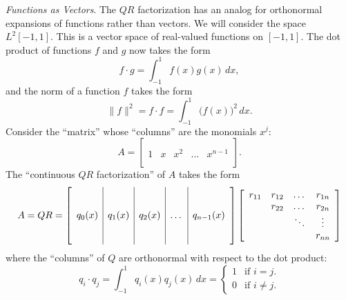 \documentclass[12pt]{exam}
\begin{document}
\begin{questions}

\question \emph{Functions as Vectors}. The $QR$ factorization has an analog for orthonormal expansions of functions rather than vectors. We will consider the space $L^2[-1,1]$. This is a vector space of real-valued functions on $[-1,1]$. The dot product of functions $f$ and $g$ now takes the form
\[f \cdot g = \int_{-1}^1 f(x) g(x)\,dx ,\]
and the norm of a function $f$ takes the form
\[\|f\|^2 = f \cdot f = \int_{-1}^1 \big(f(x)\big)^2\,dx.\] 
Consider the ``matrix'' whose ``columns'' are the monomials $x^j$:
\[A = \left[ \begin{array}{c|c|c|c|c} & & & & \\ & & & & \\ 1 & x & x^2 & \dots & x^{n-1} \\ & & & & \\ & & & & \end{array} \right] .\]
The ``continuous $QR$ factorization'' of $A$ takes the form
\[A = QR = \left[ \begin{array}{c|c|c|c|c} & & & & \\ & & & & \\ q_0(x) & q_1(x) & q_2(x) & \dots & q_{n-1}(x) \\ & & & & \\ & & & & \end{array} \right] \left[ \begin{array}{c c c c} r_{11} & r_{12} & \dots & r_{1n} \\ & r_{22} & \dots & r_{2n} \\ & & \ddots & \vdots \\ & & & r_{nn} \end{array} \right] \]
where the ``columns'' of $Q$ are orthonormal with respect to the dot product:
\[q_i \cdot q_j = \int_{-1}^1 q_i(x) q_j(x)\,dx = \begin{cases} 1 & \text{if $i = j$.} \\ 0 & \text{if $i \neq j$.} \end{cases} \]


\end{questions}
\end{document}
